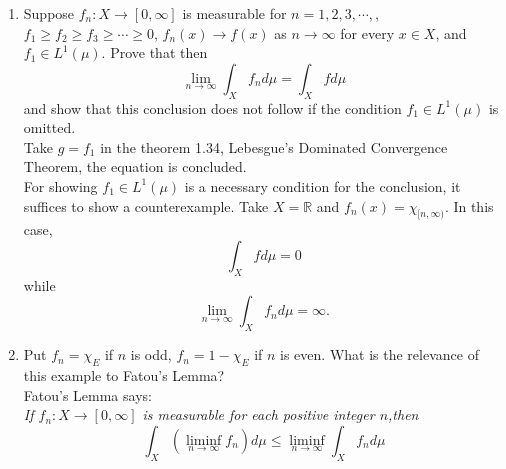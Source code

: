 \documentclass{article}
\begin{document}
\begin{enumerate}
\begin{enumerate}
 	\end{enumerate}
 	\item \exercise Suppose $f_n:X\to[0,\infty]$ is measurable for $n=1,2,3,\cdots,$, $f_1\geq f_2\geq f_3\geq\cdots\geq0$, $f_n(x)\to f(x)$ as $n\to\infty$ for every $x\in X$, and $f_1\in L^1(\mu)$. Prove that then
 	\[
 		\lim\limits_{n\to\infty}\int_{X}f_nd\mu=\int_Xfd\mu
 	\]
 	and show that this conclusion does not follow if the condition $f_1\in L^1(\mu)$ is omitted.\\
 	\solution Take $g=f_1$ in the theorem 1.34, Lebesgue's Dominated Convergence Theorem, the equation is concluded.\\
 	For showing $f_1\in L^1(\mu)$ is a necessary condition for the conclusion, it suffices to show a counterexample. Take $X=\mathbb{R}$ and $f_n(x)=\chi_{[n,\infty)}$. In this case,
 	\[
 		\int_X fd\mu=0
 	\]
 	while
 	\[
 		\lim\limits_{n\to\infty}\int_X f_nd\mu=\infty.
 	\]
 	\item \exercise Put $f_n = \chi_E$ if $n$ is odd, $f_n=1-\chi_E$ if $n$ is even. What is the relevance of this example to Fatou's Lemma?\\
 	\solution Fatou's Lemma says:\\
 	
 	\textit{If $f_n:X\to[0,\infty]$ is measurable for each positive integer $n$,then \[\int_X\left(\liminf_{n\to\infty}f_n\right)d\mu\leq\liminf_{n\to\infty}\int_X f_nd\mu\]}
 	

\end{enumerate}
\end{document}
